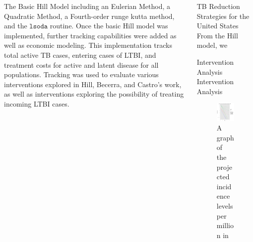 \documentclass[final]{beamer}
\begin{document}
\begin{frame}
\begin{columns}
\begin{column}{.3\textwidth}
\begin{block}{The Basic Hill Model}
        including an Eulerian Method, a Quadratic Method, a Fourth-order runge
        kutta method, and the $\texttt{lsoda}$ routine. Once the basic Hill
        model was implemented, further tracking capabilities were added as well
        as economic modeling. This implementation tracks total active TB cases,
        entering cases of LTBI, and treatment costs for active and latent disease
        for all populations. Tracking was used to evaluate various interventions
        explored in Hill, Becerra, and Castro's work, as well as interventions
        exploring the possibility of treating incoming LTBI cases.
      \end{block}
    \end{column}
    \begin{column}{.3\textwidth}
      \begin{block}{TB Reduction Strategies for the United States}
        From the Hill model, we 
      \end{block}
      \begin{block}{Intervention Analysis}
        Intervention Analysis
        \begin{figure}[h]
          \begin{center}
            \includegraphics[scale=1]{incidencePlotRedEnLTBI.pdf}
          \end{center}
          \caption{A graph of the projected incidence levels per million in
}
\end{figure}
\end{block}
\end{column}
\end{columns}
\end{frame}
\end{document}
